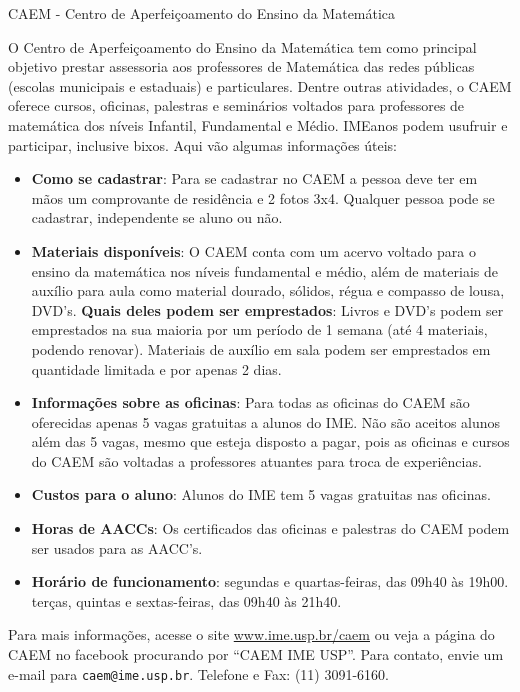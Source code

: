 \begin{secao}{CAEM - Centro de Aperfeiçoamento do Ensino da Matemática}

O Centro de Aperfeiçoamento do Ensino da Matemática tem como principal
objetivo prestar assessoria aos professores de Matemática das redes
públicas (escolas municipais e estaduais) e particulares. Dentre
outras atividades, o CAEM oferece cursos, oficinas, palestras e
seminários voltados para professores de matemática dos níveis
Infantil, Fundamental e Médio. IMEanos podem usufruir e participar,
inclusive bixos. Aqui vão algumas informações úteis:


\begin{itemize}

\item \textbf{Como se cadastrar}: Para se cadastrar no CAEM a pessoa
  deve ter em mãos um comprovante de residência e 2 fotos
  3x4. Qualquer pessoa pode se cadastrar, independente se aluno ou
  não.

\item \textbf{Materiais disponíveis}: O CAEM conta com um acervo
  voltado para o ensino da matemática nos níveis fundamental e médio,
  além de materiais de auxílio para aula como material dourado,
  sólidos, régua e compasso de lousa, DVD's. \textbf{Quais deles podem
    ser emprestados}: Livros e DVD's podem ser emprestados na sua
  maioria por um período de 1 semana (até 4 materiais, podendo
  renovar). Materiais de auxílio em sala podem ser emprestados em
  quantidade limitada e por apenas 2 dias.

\item \textbf{Informações sobre as oficinas}: Para todas as oficinas
  do CAEM são oferecidas apenas 5 vagas gratuitas a alunos do IME. Não
  são aceitos alunos além das 5 vagas, mesmo que esteja disposto a
  pagar, pois as oficinas e cursos do CAEM são voltadas a professores
  atuantes para troca de experiências.

\item \textbf{Custos para o aluno}: Alunos do IME tem 5 vagas
  gratuitas nas oficinas.

\item \textbf{Horas de AACCs}: Os certificados das oficinas e palestras
 do CAEM podem ser usados para as AACC's.

\item \textbf{Horário de funcionamento}: segundas e quartas-feiras,
  das 09h40 às 19h00. terças, quintas e sextas-feiras, das 09h40 às
  21h40.
\end{itemize}

Para mais informações, acesse o site \url{www.ime.usp.br/caem} ou veja
a página do CAEM no facebook procurando por ``CAEM IME USP''. Para
contato, envie um e-mail para {\tt caem@ime.usp.br}. Telefone e Fax:
(11) 3091-6160.


\end{secao}
